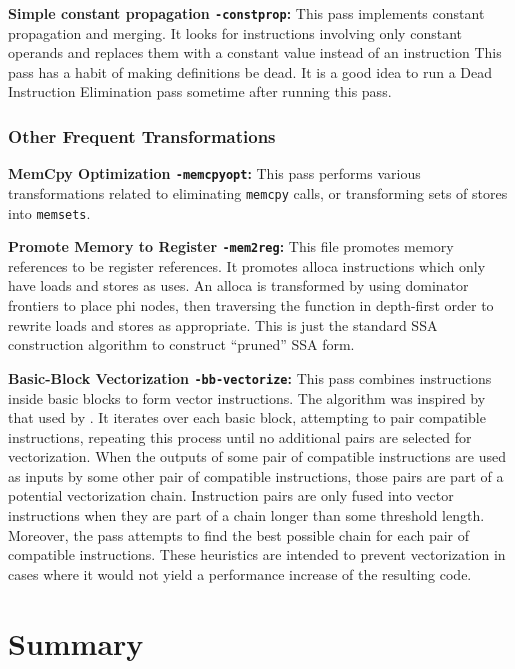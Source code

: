 \noindent\textbf{Simple constant propagation \texttt{-constprop}:}
This pass implements constant propagation and merging.
It looks for instructions involving only constant operands and replaces them with a constant value instead of an instruction
This pass has a habit of making definitions be dead.
It is a good idea to run a Dead Instruction Elimination pass sometime after running this pass.

\subsubsection{Other Frequent Transformations}

\noindent\textbf{MemCpy Optimization \texttt{-memcpyopt}:}
This pass performs various transformations related to eliminating \texttt{memcpy} calls, or transforming sets of stores into \texttt{memsets}.

\noindent\textbf{Promote Memory to Register \texttt{-mem2reg}:}
This file promotes memory references to be register references. It promotes alloca instructions which only have loads and stores as uses. An alloca is transformed by using dominator frontiers to place phi nodes, then traversing the function in depth-first order to rewrite loads and stores as appropriate. This is just the standard SSA construction algorithm to construct “pruned” SSA form.


\noindent\textbf{Basic-Block Vectorization \texttt{-bb-vectorize}:}
This pass combines instructions inside basic blocks to form vector instructions.
The algorithm was inspired by that used by \cite{franchetti05}.
It iterates over each basic block, attempting to pair compatible instructions, repeating this process until no additional pairs are selected for vectorization.
When the outputs of some pair of compatible instructions are used as inputs by some other pair of compatible instructions, those pairs are part of a potential vectorization chain.
Instruction pairs are only fused into vector instructions when they are part of a chain longer than some threshold length.
Moreover, the pass attempts to find the best possible chain for each pair of compatible instructions.
These heuristics are intended to prevent vectorization in cases where it would not yield a performance increase of the resulting code.




\section{Summary}

